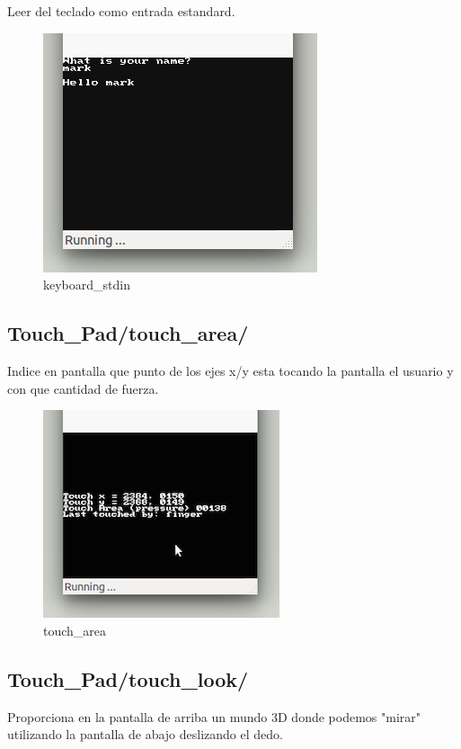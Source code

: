 \documentclass[12pt,english]{article}
\begin{document}
    Leer del teclado como entrada estandard.

    \begin{figure}[H] 
    \centering
    \includegraphics[scale=0.5]{images/keyboard_stdin}
    \caption{keyboard\_stdin}
    \end{figure}

    \subsection{Touch\_Pad/touch\_area/}

    Indice en pantalla que punto de los ejes x/y esta tocando la pantalla el usuario y con que cantidad de fuerza.

    \begin{figure}[H] 
    \centering
    \includegraphics[scale=0.5]{images/touch_area}
    \caption{touch\_area}
    \end{figure}

    \newpage

    \subsection{Touch\_Pad/touch\_look/}

    Proporciona en la pantalla de arriba un mundo 3D donde podemos "mirar" utilizando la pantalla de abajo deslizando el dedo.
\end{document}
